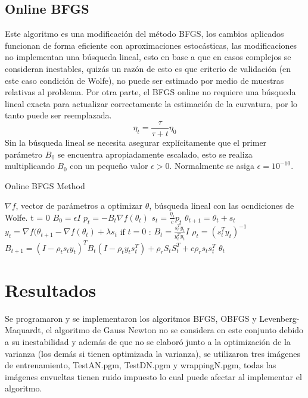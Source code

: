 \subsection{Online BFGS}
Este algoritmo es una modificaci\'on del m\'etodo BFGS, los cambios aplicados funcionan de forma eficiente con aproximaciones estoc\'asticas, las modificaciones no implementan una b\'usqueda lineal,%
esto en base a que en casos complejos se consideran inestables, quizás un razón de esto es que criterio de validación (en este caso condición de Wolfe), no puede ser estimado por medio de muestras relativas al problema.
%
Por otra parte, el BFGS online no requiere una búsqueda lineal exacta para actualizar correctamente la estimación de la curvatura, por lo tanto puede ser reemplazada.
\begin{equation}
	\eta_t = \frac{ \tau }{ \tau +t } \eta _0
\end{equation}
Sin la búsqueda lineal se necesita asegurar explícitamente que el primer parámetro $B_0$ se encuentra apropiadamente escalado, esto se realiza multiplicando $B_0$ con un pequeño valor $\epsilon > 0$. Normalmente se asiga  $\epsilon = 10^{-10}$.
\begin{algorithm}   
	\caption{Online BFGS Method}  
	\label{alg1}
	\begin{algorithmic} 
		\REQUIRE $\nabla f$, vector de parámetros a optimizar $\theta$, búsqueda lineal con las ocndiciones de Wolfe.
		\STATE t = 0 
		\STATE $B_0 = \epsilon I$
			\STATE $p_t = -B_t \nabla f(\theta_t)$
			\STATE $s_t = \frac{\eta_t}{c} p_t$
			\STATE $\theta_{t+1}= \theta_t + s_t$
			\STATE $y_t = \nabla f(\theta_{t+1} - \nabla f(\theta_t) + \lambda s_t$ 
			\STATE if $t=0$ : $B_t = \frac{s_r^T y_t}{y_t^T y_t} I$
			\STATE $\rho_t = (s_t^T y_t)^{-1}$
			\STATE $B_{t+1} = (I- \rho_t s_t y_t)^T B_t ( I - \rho_t y_t s_t^T)+\rho_r S_t S_t^T + c \rho_r s_t s_t^T$
		\ENDWHILE
	\RETURN $\theta_t$
	\end{algorithmic}
\end{algorithm}
\section{Resultados}
Se programaron y se implementaron los algoritmos BFGS, OBFGS y Levenberg-Maquardt, el algoritmo de Gauss Newton no se considera en este conjunto debido a su inestabilidad y además de que no se elaboró junto a la optimización de la varianza (los demás si tienen optimizada la varianza), se utilizaron tres imágenes de entrenamiento, TestAN.pgm, TestDN.pgm y wrappingN.pgm, todas las imágenes envueltas tienen ruido impuesto lo cual puede afectar al implementar el algoritmo.\\
%

